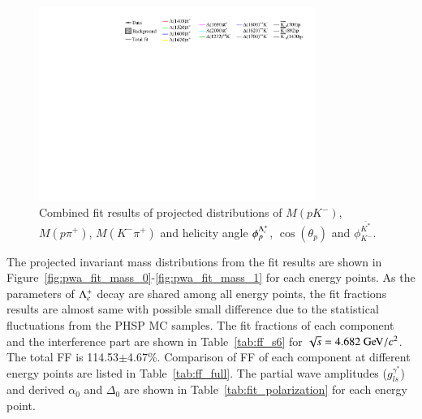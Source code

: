 \begin{figure}[htbp]
    \includegraphics[width=0.80\textwidth]{figure/pwa_nominal/legend.pdf}

    \caption{Combined fit results of projected distributions of $M(pK^-)$, $M(p\pi^+)$, $M(K^-\pi^+)$ and helicity angle $\phi_{p}^{\Lambda_{c}^{+}}$, $\cos(\theta_{p})$ and $\phi_{K^{-}}^{\bar{K^{*}}}$. }
\label{fig:pwa_nominal_comb}
\end{figure}

The projected invariant mass distributions from the fit results are shown in Figure~\ref{fig:pwa_fit_mass_0}-\ref{fig:pwa_fit_mass_1} for each energy points. As the parameters of $\Lambda_{c}^{+}$ decay are shared among all energy points, the fit fractions results are almost same with possible small difference due to the statistical fluctuations from the PHSP MC samples. The fit fractions of each component and the interference part are shown in Table~\ref{tab:ff_s6} for $\sqrt{s} = 4.682\gev/c^2$. The total FF is 114.53$\pm$4.67\%. Comparison of FF of each component at different energy points are listed in Table~\ref{tab:ff_full}.  The partial wave amplitudes ($g_{ls}^{\gamma^*}$) and derived $\alpha_0$ and $\Delta_0$ are shown in Table~\ref{tab:fit_polarization} for each energy point.

